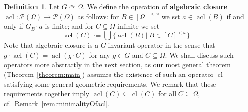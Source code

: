 \documentclass{article}
\theoremstyle{remark}
\theoremstyle{definition}
\newtheorem{definition}[theorem]{Definition}
\def\acts{\curvearrowright}
\DeclareMathOperator{\cl}{cl}
\DeclareMathOperator{\acl}{acl}
\newcommand{\fps}[1]{[#1]^{<\omega}}
\begin{document}
{{%


%





\begin{definition}\label{def:acl} Let $G\acts\Omega$. We define the operation of \textbf{algebraic closure} $\acl\colon\mathcal{P}(\Omega)\to\mathcal{P}(\Omega)$ as follows:  for $B\in [\Omega]^{<\omega}$ we set   $a\in\acl(B)$ if and only if $G_B\cdot a$ is finite; and for $C\subseteq \Omega$ infinite we set  
\[\acl(C):=\bigcup \{\acl(B)\vert \ B\in\fps{C}\}\;.\]
Note that algebraic closure is a {$G$-{invariant operator}} in the sense that $g\cdot \acl({C})=\acl(g\cdot {C})$ for any $g\in G$ and ${C}\subseteq \Omega$. {We shall discuss such operators  more abstractly in the next section, as our most general theorem (Theorem~\ref{theorem:main}) assumes the existence of such {an} {operator $\cl$ satisfying some general geometric requirements.}}
{We remark that these requirements together imply $\acl(C)\subseteq \cl{(C)}$ for all $C\subseteq \Omega$, cf.~Remark~\ref{rem:minimalityOfacl}.} 

\end{definition}

}}
\end{document}
